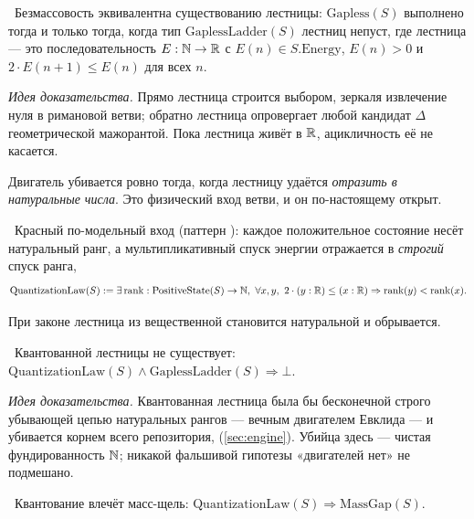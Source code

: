 \begin{theorem}\label{thm:gapless_iff_nonempty_ladder}
\green{}\ Безмассовость эквивалентна существованию лестницы: $\mathrm{Gapless}(S)$ выполнено тогда и
только тогда, когда тип $\mathrm{GaplessLadder}(S)$ лестниц непуст, где лестница --- это
последовательность $E:\mathbb{N}\to\mathbb{R}$ с $E(n)\in S.\mathrm{Energy}$, $E(n)>0$ и $2\cdot E(n+1)\le E(n)$ для
всех $n$.
\end{theorem}

\emph{Идея доказательства.} Прямо лестница строится выбором, зеркаля извлечение нуля в римановой
ветви; обратно лестница опровергает любой кандидат $\Delta$ геометрической мажорантой. Пока лестница
живёт в $\mathbb{R}$, ацикличность её не касается.

Двигатель убивается ровно тогда, когда лестницу удаётся \emph{отразить в натуральные числа}. Это
физический вход ветви, и он по-настоящему открыт.

\begin{definition}\label{def:QuantizationLaw}
\red{}\ Красный по-модельный вход (паттерн ): каждое положительное состояние
несёт натуральный ранг, а мультипликативный спуск энергии отражается в \emph{строгий} спуск ранга,
\[
  \mathrm{QuantizationLaw}(S):=\exists\,\mathrm{rank}:\mathrm{PositiveState}(S)\to\N,\
    \forall x,y,\ 2\cdot(y:\R)\le(x:\R)\Rightarrow\mathrm{rank}(y)<\mathrm{rank}(x).
\]
\end{definition}

При законе лестница из вещественной становится натуральной и обрывается.

\begin{theorem}\label{thm:no_quantizedLadder}
\green{}\ Квантованной лестницы не существует:
$\mathrm{QuantizationLaw}(S)\wedge\mathrm{GaplessLadder}(S)\Rightarrow\bot$.
\end{theorem}

\emph{Идея доказательства.} Квантованная лестница была бы бесконечной строго убывающей цепью
натуральных рангов --- вечным двигателем Евклида --- и убивается корнем всего репозитория,
\code{no\_infinite\_descent} (\cref{sec:engine}). Убийца здесь --- чистая фундированность $\mathbb{N}$; никакой
фальшивой гипотезы «двигателей нет» не подмешано.

\begin{theorem}\label{thm:massGap_of_quantizationLaw}
\green{}\ Квантование влечёт масс-щель: $\mathrm{QuantizationLaw}(S)\Rightarrow\mathrm{MassGap}(S)$.
\end{theorem}

